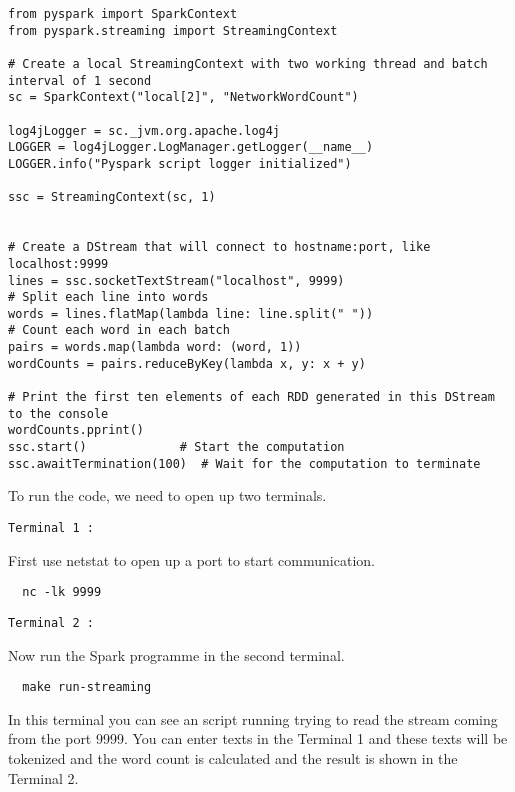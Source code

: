 \begin{lstlisting}
from pyspark import SparkContext
from pyspark.streaming import StreamingContext

# Create a local StreamingContext with two working thread and batch interval of 1 second
sc = SparkContext("local[2]", "NetworkWordCount")

log4jLogger = sc._jvm.org.apache.log4j
LOGGER = log4jLogger.LogManager.getLogger(__name__)
LOGGER.info("Pyspark script logger initialized")

ssc = StreamingContext(sc, 1)


# Create a DStream that will connect to hostname:port, like localhost:9999
lines = ssc.socketTextStream("localhost", 9999)
# Split each line into words
words = lines.flatMap(lambda line: line.split(" "))
# Count each word in each batch
pairs = words.map(lambda word: (word, 1))
wordCounts = pairs.reduceByKey(lambda x, y: x + y)

# Print the first ten elements of each RDD generated in this DStream to the console
wordCounts.pprint()
ssc.start()             # Start the computation
ssc.awaitTermination(100)  # Wait for the computation to terminate

\end{lstlisting}

To run the code, we need to open up two terminals.

\verb|Terminal 1 :|

First use netstat to open up a port to start communication.

\begin{lstlisting}
  nc -lk 9999
\end{lstlisting}


\verb|Terminal 2 :|

Now run the Spark programme in the second terminal.

\begin{lstlisting}
  make run-streaming
\end{lstlisting}

In this terminal you can see an script running trying to read
the stream coming from the port 9999. You can enter texts in the
Terminal 1 and these texts will be tokenized and the word count is
calculated and the result is shown in the Terminal 2. 